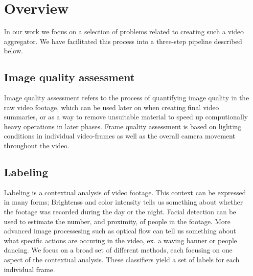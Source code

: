\section{Overview}
%
In our work we focus on a selection of problems related to creating such a video aggregator. We have facilitated this process into a three-step pipeline described below.
%
\subsection{Image quality assessment}\label{sec:videoclipsegmentation}
%
Image quality assessment refers to the process of quantifying image quality in the raw video footage, %
which can be used later on when creating final video summaries, or as a way to remove unsuitable material to speed up computionally heavy operations in later phases. %
Frame quality assessment is based on lighting conditions in individual video-frames as well as the overall camera movement throughout the video.
%
\subsection{Labeling}
%
Labeling is a contextual analysis of video footage. This context can be expressed in many forms; Brightenss and color intensity tells us something about whether the footage was recorded during the day or the night. Facial detection can be used to estimate the number, and proximity, of people in the footage. More advanced image processesing such as optical flow can tell us something about what specific actions are occuring in the video, ex. a waving banner or people dancing. We focus on a broad set of different methods, each focusing on one aspect of the contextual analysis. These classifiers yield a set of labels for each individual frame.
%
